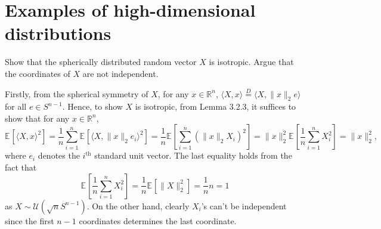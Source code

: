 \section{Examples of high-dimensional distributions}
\begin{problem*}[Exercise 3.3.1]\label{ex3.3.1}
	Show that the spherically distributed random vector \(X\) is isotropic. Argue that the coordinates of \(X\) are not independent.
\end{problem*}
\begin{answer}
	Firstly, from the spherical symmetry of \(X\), for any \(x\in \mathbb{R} ^n\), \(\langle X, x \rangle \overset{D}{=} \langle X, \lVert x \rVert _2 e \rangle \) for all \(e \in S^{n-1}\). Hence, to show \(X\) is isotropic, from Lemma 3.2.3, it suffices to show that for any \(x \in \mathbb{R} ^n\),
	\[
		\mathbb{E}_{}[\langle X, x \rangle ^2]
		= \frac{1}{n} \sum_{i=1}^{n} \mathbb{E}_{}[\langle X, \lVert x \rVert _2 e_i \rangle ^2]
		= \frac{1}{n} \mathbb{E}_{}\left[\sum_{i=1}^{n} (\lVert x \rVert _2 X_i )^2\right]
		= \lVert x \rVert _2^2 \mathbb{E}_{}\left[\frac{1}{n} \sum_{i=1}^{n} X_i^2\right]
		= \lVert x \rVert _2^2,
	\]
	where \(e_i\) denotes the \(i^{\text{th} }\) standard unit vector. The last equality holds from the fact that
	\[
		\mathbb{E}_{}\left[\frac{1}{n} \sum_{i=1}^{n} X_i^2\right]
		= \frac{1}{n} \mathbb{E}_{}[\lVert X \rVert _2^2]
		= \frac{1}{n} n
		= 1
	\]
	as \(X \sim \mathcal{U} (\sqrt{n} S^{n-1})\). On the other hand, clearly \(X_i\)'s can't be independent since the first \(n-1\) coordinates determines the last coordinate.
\end{answer}


